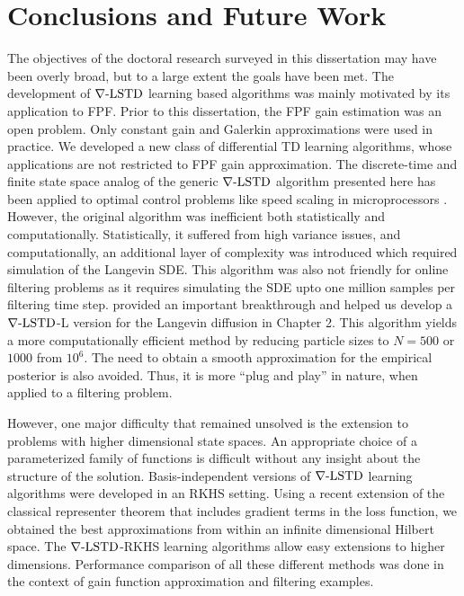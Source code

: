 \chapter{Conclusions and Future Work}
\label{ch:conclusions}
The objectives of the doctoral research surveyed in this dissertation may have been overly broad,  but to a large extent the goals have been met. The development of $\nabla\text{-LSTD}$ learning based algorithms was mainly motivated by its application to FPF. Prior to this dissertation, the FPF gain estimation was an open problem. Only constant gain and Galerkin approximations were used in practice. We developed a new class of differential TD learning algorithms, whose applications are not restricted to FPF gain approximation. The discrete-time and finite state space analog of the generic $\nabla\text{-LSTD}$ algorithm presented here has been applied to optimal control problems like speed scaling in microprocessors \cite{ctcn,devmey16a}. However, the original algorithm was inefficient both statistically and computationally. Statistically, it suffered from high variance issues, and computationally, an additional layer of complexity was introduced which required simulation of the Langevin SDE. This algorithm was also not friendly for online filtering problems as it requires simulating the SDE upto one million samples per filtering time step.  provided an important breakthrough and helped us develop a $\nabla\text{-LSTD}$-L version for the Langevin diffusion in Chapter 2. This algorithm yields a more computationally efficient method by reducing particle sizes to $N=500$ or $1000$ from $10^6$. The need to obtain a smooth approximation for the empirical posterior is also avoided. Thus, it is more ``plug and play'' in nature, when applied to a filtering problem.  

However, one major difficulty that remained unsolved is the extension to problems with higher dimensional state spaces. An appropriate choice of a parameterized family of functions is difficult without any insight about the structure of the solution. Basis-independent versions of $\nabla\text{-LSTD}$ learning algorithms were developed in an RKHS setting. Using a recent extension of the classical representer theorem that includes gradient terms in the loss function, we obtained the best approximations from within an infinite dimensional Hilbert space. The $\nabla\text{-LSTD}$-RKHS learning algorithms allow easy extensions to higher dimensions. Performance comparison of all these different methods was done in the context of gain function approximation and filtering examples. 

